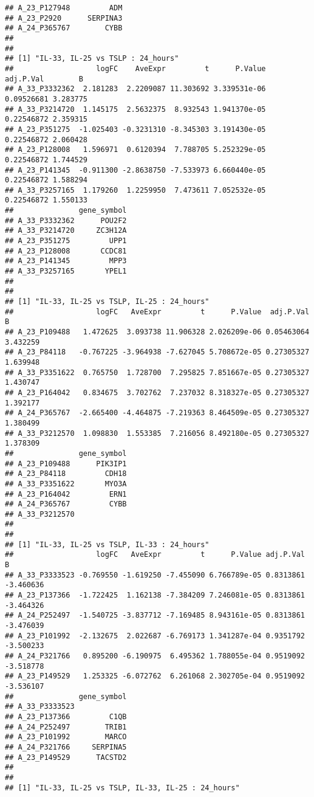 \documentclass[
]{article}
\begin{document}
\begin{verbatim}
## A_23_P127948         ADM
## A_23_P2920      SERPINA3
## A_24_P365767        CYBB
## 
## 
## [1] "IL-33, IL-25 vs TSLP : 24_hours"
##                   logFC    AveExpr         t      P.Value  adj.P.Val        B
## A_33_P3332362  2.181283  2.2209087 11.303692 3.339531e-06 0.09526681 3.283775
## A_33_P3214720  1.145175  2.5632375  8.932543 1.941370e-05 0.22546872 2.359315
## A_23_P351275  -1.025403 -0.3231310 -8.345303 3.191430e-05 0.22546872 2.060428
## A_23_P128008   1.596971  0.6120394  7.788705 5.252329e-05 0.22546872 1.744529
## A_23_P141345  -0.911300 -2.8638750 -7.533973 6.660440e-05 0.22546872 1.588294
## A_33_P3257165  1.179260  1.2259950  7.473611 7.052532e-05 0.22546872 1.550133
##               gene_symbol
## A_33_P3332362      POU2F2
## A_33_P3214720     ZC3H12A
## A_23_P351275         UPP1
## A_23_P128008       CCDC81
## A_23_P141345         MPP3
## A_33_P3257165       YPEL1
## 
## 
## [1] "IL-33, IL-25 vs TSLP, IL-25 : 24_hours"
##                   logFC   AveExpr         t      P.Value  adj.P.Val        B
## A_23_P109488   1.472625  3.093738 11.906328 2.026209e-06 0.05463064 3.432259
## A_23_P84118   -0.767225 -3.964938 -7.627045 5.708672e-05 0.27305327 1.639948
## A_33_P3351622  0.765750  1.728700  7.295825 7.851667e-05 0.27305327 1.430747
## A_23_P164042   0.834675  3.702762  7.237032 8.318327e-05 0.27305327 1.392177
## A_24_P365767  -2.665400 -4.464875 -7.219363 8.464509e-05 0.27305327 1.380499
## A_33_P3212570  1.098830  1.553385  7.216056 8.492180e-05 0.27305327 1.378309
##               gene_symbol
## A_23_P109488      PIK3IP1
## A_23_P84118         CDH18
## A_33_P3351622       MYO3A
## A_23_P164042         ERN1
## A_24_P365767         CYBB
## A_33_P3212570            
## 
## 
## [1] "IL-33, IL-25 vs TSLP, IL-33 : 24_hours"
##                   logFC   AveExpr         t      P.Value adj.P.Val         B
## A_33_P3333523 -0.769550 -1.619250 -7.455090 6.766789e-05 0.8313861 -3.460636
## A_23_P137366  -1.722425  1.162138 -7.384209 7.246081e-05 0.8313861 -3.464326
## A_24_P252497  -1.540725 -3.837712 -7.169485 8.943161e-05 0.8313861 -3.476039
## A_23_P101992  -2.132675  2.022687 -6.769173 1.341287e-04 0.9351792 -3.500233
## A_24_P321766   0.895200 -6.190975  6.495362 1.788055e-04 0.9519092 -3.518778
## A_23_P149529   1.253325 -6.072762  6.261068 2.302705e-04 0.9519092 -3.536107
##               gene_symbol
## A_33_P3333523            
## A_23_P137366         C1QB
## A_24_P252497        TRIB1
## A_23_P101992        MARCO
## A_24_P321766     SERPINA5
## A_23_P149529      TACSTD2
## 
## 
## [1] "IL-33, IL-25 vs TSLP, IL-33, IL-25 : 24_hours"

\end{verbatim}
\end{document}
